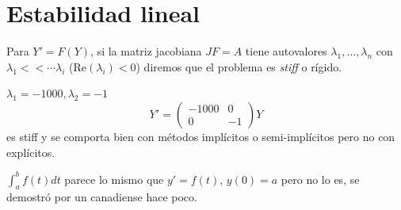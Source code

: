 \section{Estabilidad lineal}
\begin{defi}
Para $Y' = F(Y)$, si la matriz jacobiana $JF=A$ tiene autovalores $\lambda_1, \ldots, \lambda_n$ con $\lambda_1 << \cdots \lambda_i$ (Re$(\lambda_i)<0$) diremos que el problema es \textit{stiff} o r\'igido. 
\end{defi} 
\begin{ejem}
    $\lambda_1=-1000, \lambda_2=-1$
    $$Y' = \begin{pmatrix}
        -1000 & 0 \\ 0 & -1
    \end{pmatrix} Y$$
    es stiff y se comporta bien con m\'etodos impl\'icitos o semi-impl\'icitos pero no con expl\'icitos.
\end{ejem}
\begin{obs}
$\displaystyle \int_a^b f(t) dt $ parece lo mismo que $y'=f(t), \, y(0)=a$ pero no lo es, se demostr\'o por un canadiense hace poco.
\end{obs}
